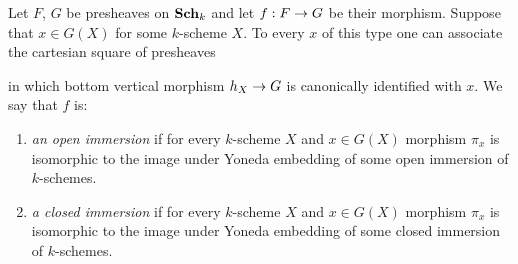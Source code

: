 \begin{definition}
Let $F$, $G$ be presheaves on $\mathbf{Sch}_k$ and let $f:F\rightarrow G$ be their morphism. Suppose that $x\in G(X)$ for some $k$-scheme $X$. To every $x$ of this type one can associate the cartesian square of presheaves
\begin{center}
\end{center}
in which bottom vertical morphism $h_X\rightarrow G$ is canonically identified with $x$. We say that $f$ is:
\begin{enumerate}[label=\textbf{(\arabic*)}, leftmargin=1.5em]
\item \textit{an open immersion} if for every $k$-scheme $X$ and $x\in G(X)$ morphism $\pi_x$ is isomorphic to the image under Yoneda embedding of some open immersion of $k$-schemes. 
\item \textit{a closed immersion} if for every $k$-scheme $X$ and $x\in G(X)$ morphism $\pi_x$ is isomorphic to the image under Yoneda embedding of some closed immersion of $k$-schemes.
\end{enumerate}
\end{definition}


